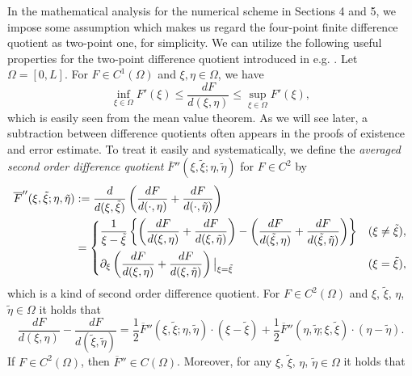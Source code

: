 \documentclass[dvipdfmx-if-dvi,autodetect-engine,ja=standard]{amsart}
\numberwithin{equation}{section} %
\begin{document}
In the mathematical analysis for the numerical scheme in Sections 4 and 5, 
we impose some assumption which makes us regard the four-point finite difference 
quotient as two-point one, for simplicity. 
We can utilize the following useful properties for the two-point difference quotient introduced in e.g. \cite{yo2}.
Let $\Omega = [0,L]$.
For $F \in C^1(\Omega)$ and $\xi, \eta \in \Omega$,
we have
\begin{equation}\label{mvt}
\inf_{\xi \in \Omega} F'(\xi) \leq \frac{d F}{d(\xi, \eta)}
	\leq \sup_{\xi \in \Omega} F'(\xi),
\end{equation}
which is easily seen from the mean value theorem. 
As we will see later, a subtraction between difference quotients often appears in the proofs of existence and error estimate.  
To treat it easily and systematically, 
we define the \textit{averaged second order difference quotient} $\overline{F}''(\xi,\tilde{\xi};\eta,\tilde{\eta})$ for $F \in C^2$ by    
\begin{equation*}
\begin{split}
\overline{F}''(\xi,\tilde{\xi};\eta,\tilde{\eta}) &:= \frac{d}{d (\xi,\tilde{\xi})}
	 \left( \frac{d F}{d(\cdot, \eta)} + \frac{d F}{d(\cdot, \tilde{\eta})} \right)  \\ 
	&= 
	\begin{dcases} \frac{1}{\xi-\tilde{\xi}} \left\{  
	\left( \frac{d F}{d(\xi, \eta)} + \frac{d F}{d(\xi, \tilde{\eta})} \right) 
		-  \left( \frac{d F}{d(\tilde{\xi}, \eta)} + \frac{d F}{d(\tilde{\xi}, \tilde{\eta})} \right) \right\}
		&(\xi \neq \tilde{\xi}), \\ 
	 \partial_{\xi} 
		\left( \frac{d F}{d(\xi, \eta)} + \frac{d F}{d(\xi, \tilde{\eta})} \right) \big|_{\xi=\tilde{\xi}}
	&(\xi = \tilde{\xi}), 
	\end{dcases}
\end{split}
\end{equation*}
which is a kind of second order difference quotient. 
For $F \in C^2(\Omega)$ and $\xi$, $\tilde{\xi}$, $\eta$, $\tilde{\eta} \in \Omega$ it holds that 
\begin{equation}\label{eq:2nd-dq}
\frac{d F}{d(\xi, \eta)} - \frac{d F}{d(\tilde{\xi}, \tilde{\eta})} 
	= \frac{1}{2} \overline{F}''(\xi,\tilde{\xi};\eta,\tilde{\eta}) \cdot (\xi-\tilde{\xi}) 
	+  \frac{1}{2} \overline{F}''(\eta,\tilde{\eta};\xi,\tilde{\xi}) \cdot (\eta-\tilde{\eta}). 
\end{equation}
If $F \in C^2(\Omega)$, then $\overline{F}'' \in C(\Omega)$. Moreover, 
for any $\xi$, $\tilde{\xi}$, $\eta$, $\tilde{\eta} \in \Omega$ it holds that 
\end{document}
